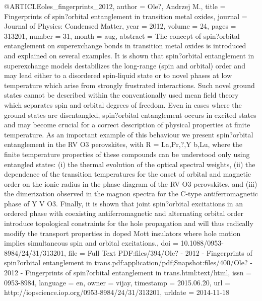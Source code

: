 @ARTICLE{oles_fingerprints_2012,
  author = {Ole?, Andrzej M.},
  title = {Fingerprints of spin?orbital entanglement in transition metal oxides},
  journal = {Journal of Physics: Condensed Matter},
  year = {2012},
  volume = {24},
  pages = {313201},
  number = {31},
  month = aug,
  abstract = {The concept of spin?orbital entanglement on superexchange bonds in
	transition metal oxides is introduced and explained on several examples.
	It is shown that spin?orbital entanglement in superexchange models
	destabilizes the long-range (spin and orbital) order and may lead
	either to a disordered spin-liquid state or to novel phases at low
	temperature which arise from strongly frustrated interactions. Such
	novel ground states cannot be described within the conventionally
	used mean field theory which separates spin and orbital degrees of
	freedom. Even in cases where the ground states are disentangled,
	spin?orbital entanglement occurs in excited states and may become
	crucial for a correct description of physical properties at finite
	temperature. As an important example of this behaviour we present
	spin?orbital entanglement in the RV O3 perovskites, with R = La,Pr,?,Y
	b,Lu, where the finite temperature properties of these compounds
	can be understood only using entangled states: (i) the thermal evolution
	of the optical spectral weights, (ii) the dependence of the transition
	temperatures for the onset of orbital and magnetic order on the ionic
	radius in the phase diagram of the RV O3 perovskites, and (iii) the
	dimerization observed in the magnon spectra for the C-type antiferromagnetic
	phase of Y V O3. Finally, it is shown that joint spin?orbital excitations
	in an ordered phase with coexisting antiferromagnetic and alternating
	orbital order introduce topological constraints for the hole propagation
	and will thus radically modify the transport properties in doped
	Mott insulators where hole motion implies simultaneous spin and orbital
	excitations.},
  doi = {10.1088/0953-8984/24/31/313201},
  file = {Full Text PDF:files/394/Ole? - 2012 - Fingerprints of spin?orbital entanglement in trans.pdf:application/pdf;Snapshot:files/400/Ole? - 2012 - Fingerprints of spin?orbital entanglement in trans.html:text/html},
  issn = {0953-8984},
  language = {en},
  owner = {vijay},
  timestamp = {2015.06.20},
  url = {http://iopscience.iop.org/0953-8984/24/31/313201},
  urldate = {2014-11-18}
}

